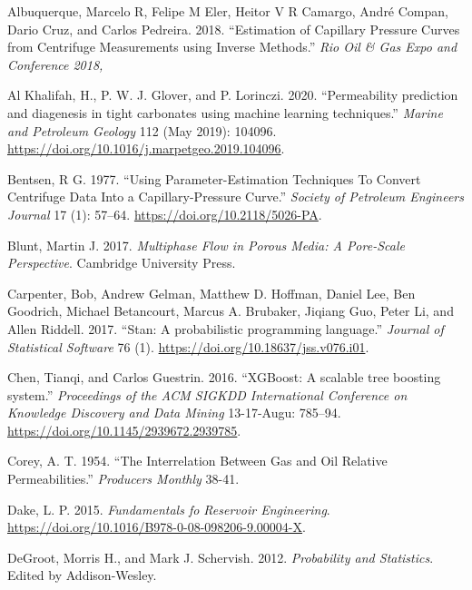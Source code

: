 \documentclass[english,msc,numbers]{coppe}
\begin{document}
  \hypertarget{refs}{}
  \leavevmode\hypertarget{ref-Albuquerque2018}{}%
  Albuquerque, Marcelo R, Felipe M Eler, Heitor V R Camargo, André Compan, Dario Cruz, and Carlos Pedreira. 2018. ``Estimation of Capillary Pressure Curves from Centrifuge Measurements using Inverse Methods.'' \emph{Rio Oil \& Gas Expo and Conference 2018,}
  
  \leavevmode\hypertarget{ref-AlKhalifah2020}{}%
  Al Khalifah, H., P. W. J. Glover, and P. Lorinczi. 2020. ``Permeability prediction and diagenesis in tight carbonates using machine learning techniques.'' \emph{Marine and Petroleum Geology} 112 (May 2019): 104096. \url{https://doi.org/10.1016/j.marpetgeo.2019.104096}.
  
  \leavevmode\hypertarget{ref-Bentsen1977}{}%
  Bentsen, R G. 1977. ``Using Parameter-Estimation Techniques To Convert Centrifuge Data Into a Capillary-Pressure Curve.'' \emph{Society of Petroleum Engineers Journal} 17 (1): 57--64. \url{https://doi.org/10.2118/5026-PA}.
  
  \leavevmode\hypertarget{ref-Blunt2017}{}%
  Blunt, Martin J. 2017. \emph{Multiphase Flow in Porous Media: A Pore-Scale Perspective}. Cambridge University Press.
  
  \leavevmode\hypertarget{ref-Carpenter2017}{}%
  Carpenter, Bob, Andrew Gelman, Matthew D. Hoffman, Daniel Lee, Ben Goodrich, Michael Betancourt, Marcus A. Brubaker, Jiqiang Guo, Peter Li, and Allen Riddell. 2017. ``Stan: A probabilistic programming language.'' \emph{Journal of Statistical Software} 76 (1). \url{https://doi.org/10.18637/jss.v076.i01}.
  
  \leavevmode\hypertarget{ref-Chen2016}{}%
  Chen, Tianqi, and Carlos Guestrin. 2016. ``XGBoost: A scalable tree boosting system.'' \emph{Proceedings of the ACM SIGKDD International Conference on Knowledge Discovery and Data Mining} 13-17-Augu: 785--94. \url{https://doi.org/10.1145/2939672.2939785}.
  
  \leavevmode\hypertarget{ref-Corey1954}{}%
  Corey, A. T. 1954. ``The Interrelation Between Gas and Oil Relative Permeabilities.'' \emph{Producers Monthly} 38-41.
  
  \leavevmode\hypertarget{ref-Dake2015}{}%
  Dake, L. P. 2015. \emph{Fundamentals fo Reservoir Engineering}. \url{https://doi.org/10.1016/B978-0-08-098206-9.00004-X}.
  
  \leavevmode\hypertarget{ref-DeGroot2012}{}%
  DeGroot, Morris H., and Mark J. Schervish. 2012. \emph{Probability and Statistics}. Edited by Addison-Wesley.
  
\end{document}
